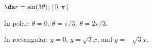 {$\ds r=\sin(3\theta)$;\quad $[0,\pi]$}
{In polar: $\theta = 0,\ \theta = \pi/3,\ \theta = 2\pi/3$.

In rectangular: $y=0$, $y=\sqrt{3}x$, and $y= -\sqrt{3}x$.
}
